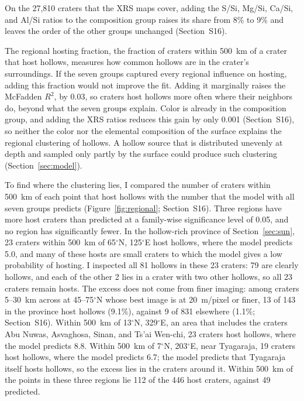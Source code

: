 \documentclass[article,review]{planetary}
\begin{document}
On the 27,810 craters that the XRS maps cover, adding the S/Si, Mg/Si, Ca/Si, and Al/Si ratios to the composition group raises its share from 8\% to 9\% and leaves the order of the other groups unchanged (Section~S16).

The regional hosting fraction, the fraction of craters within 500~km of a crater that host hollows, measures how common hollows are in the crater's surroundings. If the seven groups captured every regional influence on hosting, adding this fraction would not improve the fit. Adding it marginally raises the McFadden $R^2$, by 0.03, so craters host hollows more often where their neighbors do, beyond what the seven groups explain. Color is already in the composition group, and adding the XRS ratios reduces this gain by only 0.001 (Section~S16), so neither the color nor the elemental composition of the surface explains the regional clustering of hollows. A hollow source that is distributed unevenly at depth and sampled only partly by the surface could produce such clustering (Section~\ref{sec:model}).

To find where the clustering lies, I compared the number of craters within 500~km of each point that host hollows with the number that the model with all seven groups predicts (Figure~\ref{fig:regional}; Section~S16). Three regions have more host craters than predicted at a family-wise significance level of 0.05, and no region has significantly fewer. In the hollow-rich province of Section~\ref{sec:sun}, 23 craters within 500~km of 65$^\circ$N, 125$^\circ$E host hollows, where the model predicts 5.0, and many of these hosts are small craters to which the model gives a low probability of hosting. I inspected all 81 hollows in these 23 craters: 79 are clearly hollows, and each of the other 2 lies in a crater with two other hollows, so all 23 craters remain hosts. The excess does not come from finer imaging: among craters 5--30~km across at 45--75$^\circ$N whose best image is at 20~m/pixel or finer, 13 of 143 in the province host hollows (9.1\%), against 9 of 831 elsewhere (1.1\%; Section~S16). Within 500~km of 13$^\circ$N, 329$^\circ$E, an area that includes the craters Abu Nuwas, Asvaghosa, Sinan, and Ts'ai Wen-chi, 23 craters host hollows, where the model predicts 8.8. Within 500~km of 7$^\circ$N, 203$^\circ$E, near Tyagaraja, 19 craters host hollows, where the model predicts 6.7; the model predicts that Tyagaraja itself hosts hollows, so the excess lies in the craters around it. Within 500~km of the points in these three regions lie 112 of the 446 host craters, against 49 predicted.
\end{document}
